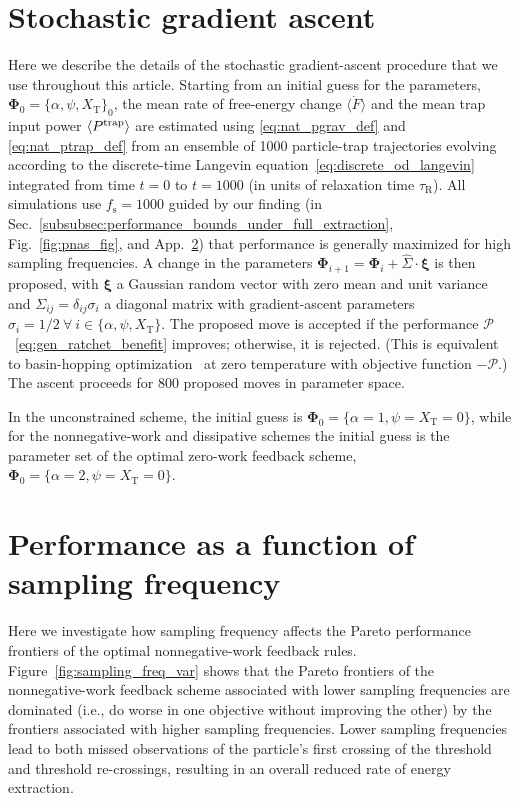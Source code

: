 \documentclass[%
reprint,
bibnotes, amsmath, amssymb, aps, pre,
 showkeys,
floatfix
]{revtex4-2}
\newcommand{\mrm}{\mathrm}
\newcommand{\mcal}{\mathcal}
\newcommand{\trelo}{\tau_{\mrm{R}}}
\newcommand{\fs}{f_{\mrm{s}}}
\newcommand{\ept}{\ev{P^{\mrm{trap}}}}
\newcommand{\epg}{\langle\dot{F}\rangle}
\newcommand{\xT}{X_{\mrm{T}}}
\newcommand{\mP}{\mcal{P}}
\begin{document}
\section{Stochastic gradient ascent}
\label{sec:grad_ascent}

Here we describe the details of the stochastic gradient-ascent procedure that we use throughout this article.
Starting from an initial guess for the parameters, $\bm{\Phi}_{0} = \{\alpha,\psi,\xT\}_{0}$, the mean rate of free-energy change $\epg$ and the mean trap input power $\ept$ are estimated using \eqref{eq:nat_pgrav_def} and \eqref{eq:nat_ptrap_def} from an ensemble of 1000 particle-trap trajectories evolving according to the discrete-time Langevin equation~\eqref{eq:discrete_od_langevin} integrated from time $t=0$ to $t=1000$ (in units of relaxation time $\trelo$).
All simulations use $\fs=1000$ guided by our finding (in Sec.~\ref{subsubsec:performance_bounds_under_full_extraction}, Fig.~\ref{fig:pnas_fig}, 
and App.~\ref{sec:sampling_freq_variation}) that performance is generally maximized for high sampling frequencies.
A change in the parameters $\bm{\Phi}_{i+1} = \bm{\Phi}_{i} + \hat{\Sigma}\cdot\bm{\xi}$ is then proposed, with $\bm{\xi}$ a Gaussian random vector with zero mean and unit variance and $\Sigma_{ij} = \delta_{ij}\sigma_{i}$ a diagonal matrix with gradient-ascent parameters $\sigma_{i} = 1/2\ \forall\ i\in\{\alpha,\psi,\xT\}$. 
The proposed move is accepted if the performance $\mP$~\eqref{eq:gen_ratchet_benefit} improves; otherwise, it is rejected.
(This is equivalent to basin-hopping optimization~\cite{Wales1997} at zero temperature with objective function $-\mP$.)
The ascent proceeds for 800 proposed moves in parameter space.

In the unconstrained scheme, the initial guess is $\bm{\Phi}_{0} = \{\alpha=1,\psi=\xT=0\}$, while for the nonnegative-work and dissipative schemes the initial guess is the parameter set of the optimal zero-work feedback scheme, $\bm{\Phi}_{0} = \{\alpha=2,\psi=\xT=0\}$.


\section{Performance as a function of sampling frequency}
\label{sec:sampling_freq_variation}

Here we investigate how sampling frequency affects the Pareto performance frontiers of the optimal nonnegative-work feedback rules.
Figure~\ref{fig:sampling_freq_var} shows that the Pareto frontiers of the nonnegative-work feedback scheme associated with lower sampling frequencies are dominated (i.e., do worse in one objective without improving the other) by the frontiers associated with higher sampling frequencies. 
Lower sampling frequencies lead to both missed observations of the particle's first crossing of the threshold and threshold re-crossings, resulting in an overall reduced rate of energy extraction.
\end{document}
